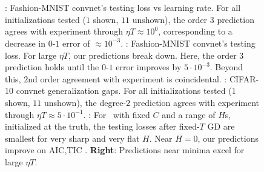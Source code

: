         \begin{figure}[h!]
            \centering  
            \\
            \\
            \caption{
                \protect{}: 
                Fashion-MNIST convnet's testing loss vs learning rate.
                For all initializations tested ($1$
                shown, $11$ unshown), the order $3$ prediction agrees with
                experiment through $\eta T \approx 10^0$, corresponding to
                a decrease in $0\mbox{-}1$ error of $\approx 10^{-3}$.
                \protect{}:
                Fashion-MNIST convnet's testing loss.
                For large $\eta T$, our predictions
                break down.  Here, the order $3$ prediction holds until the
                $0\mbox{-}1$ error improves by $5\cdot 10^{-3}$.  Beyond
                this, $2$nd order agreement with experiment is
                coincidental.  
                \protect{}: CIFAR-10 convnet generalization gaps.  For all
                initializations tested ($1$ shown, $11$ unshown), the degree-$2$
                prediction agrees with experiment through $\eta T \approx
                5\cdot 10^{-1}$.
                \protect{}: For \MeanEstimation\, with fixed $C$ and
                a range of $H$s, initialized at the truth, the testing
                losses after fixed-$T$ GD are smallest for very sharp and
                very flat $H$.  Near $H=0$, our predictions improve on AIC,TIC
                \citep{di18}.
            {\bf Right}: Predictions near minima excel for
            large $\eta T$.
            }
            \label{fig:experiments}
        \end{figure}
